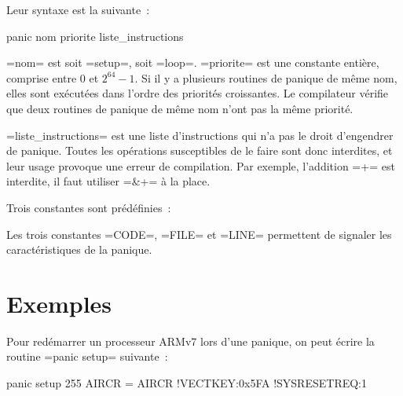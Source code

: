 Leur syntaxe est la suivante~:
\begin{PLM}
panic nom priorite {
  liste_instructions
}
\end{PLM}

\plm=nom= est soit \plm=setup=, soit \plm=loop=. \plm=priorite= est une constante entière, comprise entre $0$ et $2^{64}-1$. Si il y a plusieurs routines de panique de même nom, elles sont exécutées dans l'ordre des priorités croissantes. Le compilateur vérifie que deux routines de panique de même nom n'ont pas la même priorité.

\plm=liste_instructions= est une liste d'instructions qui n'a pas le droit d'engendrer de panique. Toutes les opérations susceptibles de le faire sont donc interdites, et leur usage provoque une erreur de compilation. Par exemple, l'addition \plm=+= est interdite, il faut utiliser \plm=&+= à la place.

Trois constantes sont prédéfinies~:

Les trois constantes \plm=CODE=, \plm=FILE= et \plm=LINE= permettent de signaler les caractéristiques de la panique.


\section{Exemples}

Pour redémarrer un processeur ARMv7 lors d'une panique, on peut écrire la routine \plm=panic setup= suivante~:
\begin{PLM}
panic setup 255 {
  AIRCR = {AIRCR !VECTKEY:0x5FA !SYSRESETREQ:1}
}
\end{PLM}
